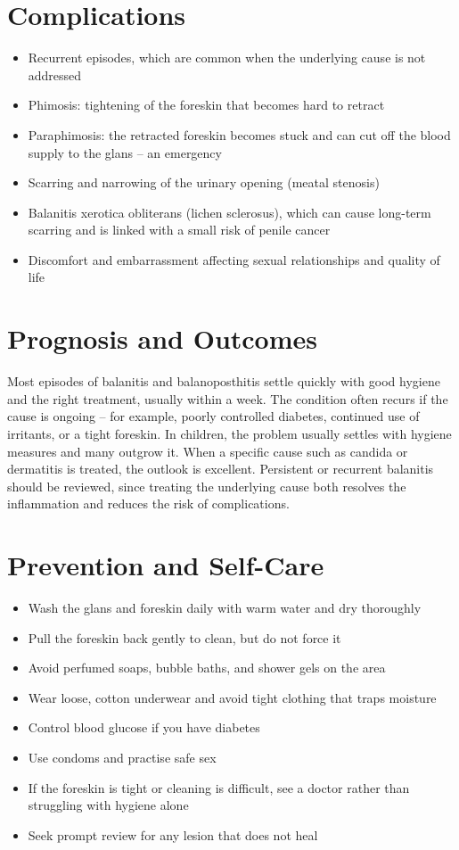 \section*{Complications}
\begin{itemize}
    \item Recurrent episodes, which are common when the underlying cause is not addressed
    \item Phimosis: tightening of the foreskin that becomes hard to retract
    \item Paraphimosis: the retracted foreskin becomes stuck and can cut off the blood supply to the glans -- an emergency
    \item Scarring and narrowing of the urinary opening (meatal stenosis)
    \item Balanitis xerotica obliterans (lichen sclerosus), which can cause long-term scarring and is linked with a small risk of penile cancer
    \item Discomfort and embarrassment affecting sexual relationships and quality of life
\end{itemize}

\section*{Prognosis and Outcomes}
Most episodes of balanitis and balanoposthitis settle quickly with good hygiene and the right treatment, usually within a week. The condition often recurs if the cause is ongoing -- for example, poorly controlled diabetes, continued use of irritants, or a tight foreskin. In children, the problem usually settles with hygiene measures and many outgrow it. When a specific cause such as candida or dermatitis is treated, the outlook is excellent. Persistent or recurrent balanitis should be reviewed, since treating the underlying cause both resolves the inflammation and reduces the risk of complications.

\section*{Prevention and Self-Care}
\begin{itemize}
    \item Wash the glans and foreskin daily with warm water and dry thoroughly
    \item Pull the foreskin back gently to clean, but do not force it
    \item Avoid perfumed soaps, bubble baths, and shower gels on the area
    \item Wear loose, cotton underwear and avoid tight clothing that traps moisture
    \item Control blood glucose if you have diabetes
    \item Use condoms and practise safe sex
    \item If the foreskin is tight or cleaning is difficult, see a doctor rather than struggling with hygiene alone
    \item Seek prompt review for any lesion that does not heal
\end{itemize}

